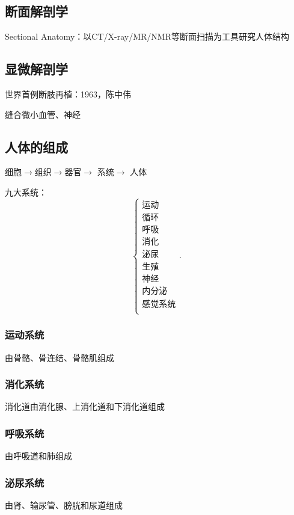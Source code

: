 \subsection*{断面解剖学}%
\label{sub:断面解剖学}
Sectional Anatomy：以CT/X-ray/MR/NMR等断面扫描为工具研究人体结构
\subsection*{显微解剖学}%
\label{sub:显微解剖学}
\begin{notation}
    世界首例断肢再植：1963，陈中伟
\end{notation}
缝合微小血管、神经

\subsection{人体的组成}%
\label{sub:人体的组成}
细胞$\to $组织$\to $器官$\to $ 系统$\to $ 人体

九大系统：
\[
    \begin{cases}
        \text{运动}\\
        \text{循环}\\
        \text{呼吸}\\
        \text{消化}\\
        \text{泌尿}\\
        \text{生殖}\\
        \text{神经}\\
        \text{内分泌}\\
        \text{感觉系统}\\
    \end{cases}
.\] 
\subsubsection*{运动系统}%
\label{subsub:运动系统}
由骨骼、骨连结、骨骼肌组成
\subsubsection*{消化系统}%
\label{subsub:消化系统}
消化道由消化腺、上消化道和下消化道组成
\subsubsection*{呼吸系统}%
\label{subsub:呼吸系统}
由呼吸道和肺组成
\subsubsection*{泌尿系统}%
\label{subsub:泌尿系统}
由肾、输尿管、膀胱和尿道组成

